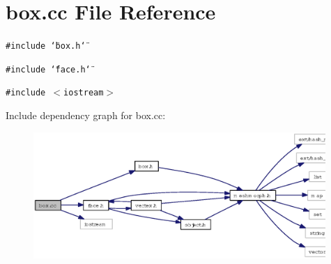 \section{box.cc File Reference}
\label{box_8cc}
{\tt \#include \char`\"{}box.h\char`\"{}}\par
{\tt \#include \char`\"{}face.h\char`\"{}}\par
{\tt \#include $<$iostream$>$}\par


Include dependency graph for box.cc:\begin{figure}[H]
\begin{center}
\leavevmode
\includegraphics[width=314pt]{box_8cc__incl}
\end{center}
\end{figure}
